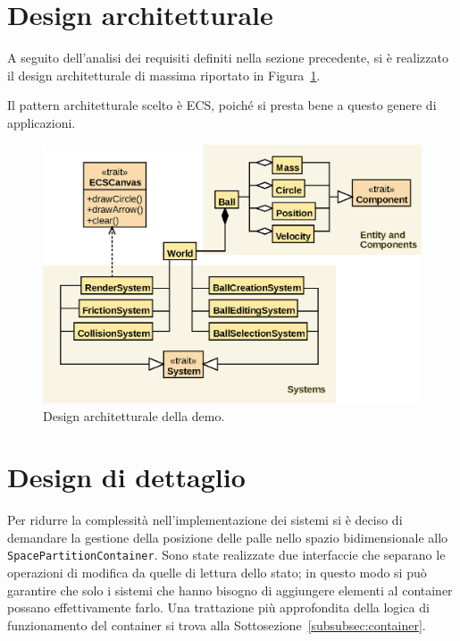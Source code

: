 \section{Design architetturale}\label{sec:demo-design-architetturale}
A seguito dell'analisi dei requisiti definiti nella sezione precedente, si è realizzato il design architetturale di
massima riportato in Figura~\ref{fig:demo}.

Il pattern architetturale scelto è ECS, poiché si presta bene a questo genere di applicazioni.

\begin{figure}[H]
    \centering
    \includegraphics[width=\textwidth]{./img/DemoArchitecture}
    \caption{Design architetturale della demo.}
    \label{fig:demo}
\end{figure}

\section{Design di dettaglio}\label{sec:demo-design-di-dettaglio}
Per ridurre la complessità nell'implementazione dei sistemi si è deciso di demandare la gestione della posizione delle
palle nello spazio bidimensionale allo \texttt{SpacePartitionContainer}.
Sono state realizzate due interfaccie che separano le operazioni di modifica da quelle di lettura dello stato;
in questo modo si può garantire che solo i sistemi che hanno bisogno di aggiungere elementi al container possano
effettivamente farlo.
Una trattazione più approfondita della logica di funzionamento del container si trova alla
Sottosezione~\ref{subsubsec:container}.

